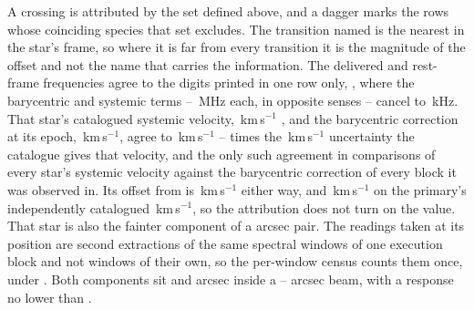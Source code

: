 A crossing is attributed by the set defined above, and a dagger marks the
\MkNSODecide{} rows whose coinciding species that set excludes. The
transition named is the nearest in the star's frame, so where it is far from
every transition it is the magnitude of the offset and not the name that
carries the information. The delivered and rest-frame frequencies agree to
the digits printed in one row only, \MkCancStar, where the barycentric and
systemic terms -- \MkCancBaryMHz\,MHz each, in opposite senses -- cancel to
\MkCancNetkHz\,kHz. That star's catalogued systemic velocity,
\MkCancVSys\,km\,s$^{-1}$ \citep{ZunigaFernandez2021}, and the
barycentric correction at its epoch,
\MkCancVBary\,km\,s$^{-1}$, agree to \VsAgreeKms\,km\,s$^{-1}$ --
\VsRvRatio{} times the \VsRvErr\,km\,s$^{-1}$ uncertainty the catalogue
gives that velocity, and the only
such agreement in \VsNComp{} comparisons of every star's systemic velocity
against the barycentric correction of every block it was observed in. Its
offset from \MkCancLine{} is \MkCancDv\,km\,s$^{-1}$ either way, and
\VsPrimDv\,km\,s$^{-1}$ on the primary's independently catalogued
\VsPrimV\,km\,s$^{-1}$, so the attribution does not turn on the value. That star is also the fainter component
of a \CenPairSep{} arcsec pair. The
\CenPairNWin{} readings taken at its position are second extractions of the
same \CenPairNWin{} spectral windows of one execution block and not windows
of their own, so the per-window census counts them once, under
\CenPairNameA. Both components sit \CenPairOffA{} and \CenPairOffB{} arcsec
inside a \CenPairPbFwhmLo--\CenPairPbFwhmHi{} arcsec beam, with a response no
lower than \CenPairPbRespLo.

